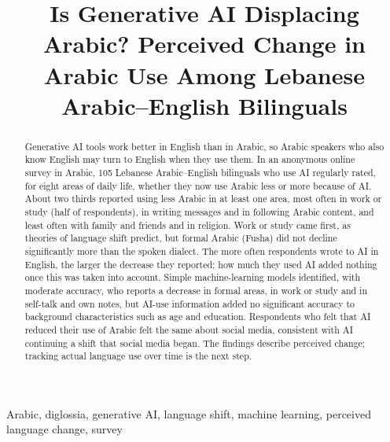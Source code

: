 \documentclass[conference]{IEEEtran}
\begin{document}

\title{Is Generative AI Displacing Arabic? Perceived Change in Arabic Use Among Lebanese Arabic--English Bilinguals}

\author{
}

\maketitle
\thispagestyle{plain}
\pagestyle{plain}
\raggedbottom

\begin{abstract}
Generative AI tools work better in English than in Arabic, so Arabic speakers who also know English may turn to English when they use them. In an anonymous online survey in Arabic, 105 Lebanese Arabic--English bilinguals who use AI regularly rated, for eight areas of daily life, whether they now use Arabic less or more because of AI. About two thirds reported using less Arabic in at least one area, most often in work or study (half of respondents), in writing messages and in following Arabic content, and least often with family and friends and in religion. Work or study came first, as theories of language shift predict, but formal Arabic (Fusha) did not decline significantly more than the spoken dialect. The more often respondents wrote to AI in English, the larger the decrease they reported; how much they used AI added nothing once this was taken into account. Simple machine-learning models identified, with moderate accuracy, who reports a decrease in formal areas, in work or study and in self-talk and own notes, but AI-use information added no significant accuracy to background characteristics such as age and education. Respondents who felt that AI reduced their use of Arabic felt the same about social media, consistent with AI continuing a shift that social media began. The findings describe perceived change; tracking actual language use over time is the next step.
\end{abstract}

\begin{IEEEkeywords}
Arabic, diglossia, generative AI, language shift, machine learning, perceived language change, survey
\end{IEEEkeywords}

\end{document}
